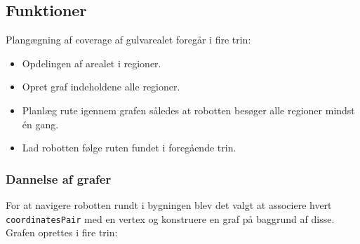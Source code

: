 \subsection{Funktioner}
Plangægning af coverage af gulvarealet foregår i fire trin:
\begin{itemize}
	\item Opdelingen af arealet i regioner.
	\item Opret graf indeholdene alle regioner.
	\item Planlæg rute igennem grafen således at robotten besøger alle regioner mindst én gang.
	\item Lad robotten følge ruten fundet i foregående trin.
\end{itemize}

\subsubsection{Dannelse af grafer}
For at navigere robotten rundt i bygningen blev det valgt at associere hvert \texttt{coordinatesPair} med en vertex og konstruere en graf på baggrund af disse. Grafen oprettes i fire trin:
